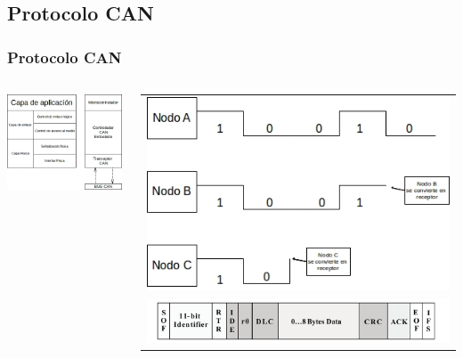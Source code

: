 \subsection{Protocolo CAN}
\begin{frame}
	\frametitle{Protocolo CAN}
	\begin{columns}[T]
		\begin{column}{.5\textwidth}
			\centering
			\includegraphics[scale=0.4]{images/ISO11898_Arquitectura_Standar.jpg}
		\end{column}
	    \begin{column}{.5\textwidth}
			\begin{table}[]
				\centering
				\begin{tabular}{c}
					\includegraphics[scale=0.3]{images/CAN_BUS_Traffic.jpg} \\
					\includegraphics[scale=0.1]{images/StandarCAN.png} \\

\end{tabular}
\end{table}
\end{column}
\end{columns}
\end{frame}
